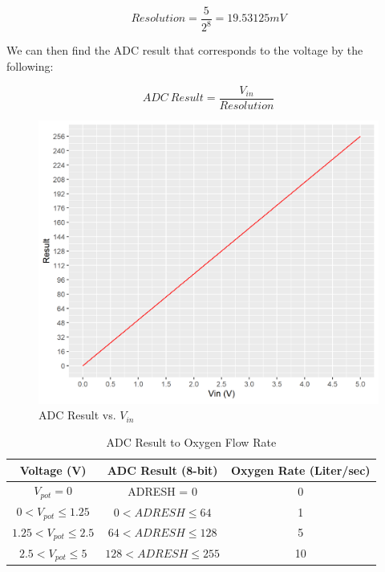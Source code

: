 \documentclass[a4paper, 12pt]{article}
\begin{document}
\begin{equation*}
	Resolution = \frac{5}{2^8} = 19.53125 mV
\end{equation*}

We can then find the ADC result that corresponds to the voltage by the following:

\begin{equation*}
	ADC \: Result = \frac{V_{in}}{Resolution}
\end{equation*}

\begin{figure}[H]
\centering
\includegraphics[width=0.9\linewidth]{images/plot}
\caption{ADC Result vs. $V_{in}$}
\end{figure}

\begin{table}[h]
\begin{center}
 \def\arraystretch{1.5}
 \begin{tabular}{|c|c|c|} 

 \hline
 Voltage (V) & ADC Result (8-bit) & Oxygen Rate (Liter/sec) \\ [0.5ex] 
 \hline\hline
 $V_{pot} = 0 $ & ADRESH = 0 & 0 \\ 
 \hline
 $0 < V_{pot} \leq 1.25$ & $0 < ADRESH \leq 64$ & 1 \\ 
 \hline
 $1.25 < V_{pot} \leq 2.5$ & $64 < ADRESH \leq 128$ & 5 \\ 
 \hline
 $2.5 < V_{pot} \leq 5$ & $128 < ADRESH \leq 255$ & 10 \\ [1ex] 
 \hline
\end{tabular}\caption{ADC Result to Oxygen Flow Rate}
\end{center}
\end{table}
\end{document}
